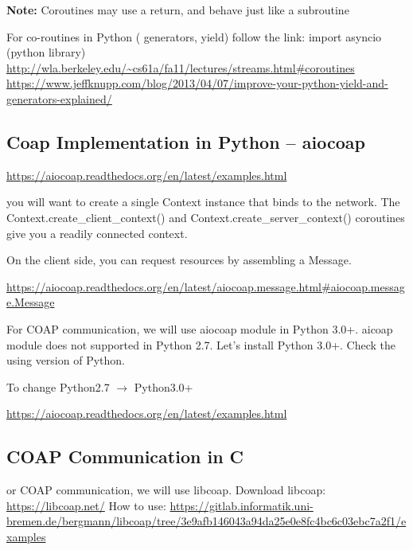 \documentclass[letterpaper,10pt,english]{sphinxmanual}
\begin{document}
\textbf{Note:} Coroutines may use a return, and behave just like a subroutine

For co-routines in Python ( generators, yield) follow the link: import asyncio (python library)
\href{http://wla.berkeley.edu/~cs61a/fa11/lectures/streams.html\#coroutines}{http://wla.berkeley.edu/\textasciitilde{}cs61a/fa11/lectures/streams.html\#coroutines}
\href{https://www.jeffknupp.com/blog/2013/04/07/improve-your-python-yield-and-generators-explained/}{https://www.jeffknupp.com/blog/2013/04/07/improve-your-python-yield-and-generators-explained/}


\subsection{Coap Implementation in Python – aiocoap}
\label{week-10:coap-implementation-in-python-aiocoap}
\href{https://aiocoap.readthedocs.org/en/latest/examples.html}{https://aiocoap.readthedocs.org/en/latest/examples.html}

you will want to create a single Context instance that binds to the network.  The Context.create\_client\_context() and Context.create\_server\_context() coroutines give you a readily connected context.

On the client side, you can request resources by assembling a Message.

\href{https://aiocoap.readthedocs.org/en/latest/aiocoap.message.html\#aiocoap.message.Message}{https://aiocoap.readthedocs.org/en/latest/aiocoap.message.html\#aiocoap.message.Message}

For COAP communication, we will use aiocoap module in Python 3.0+. aicoap module does not supported in Python 2.7. Let's install Python 3.0+.
Check the using version of Python.


To change Python2.7 \(\rightarrow\) Python3.0+


\href{https://aiocoap.readthedocs.org/en/latest/examples.html}{https://aiocoap.readthedocs.org/en/latest/examples.html}


\subsection{COAP Communication in C}
\label{week-10:coap-communication-in-c}
or COAP communication, we will use libcoap.
Download libcoap: \href{https://libcoap.net/}{https://libcoap.net/}
How to use: \href{https://gitlab.informatik.uni-bremen.de/bergmann/libcoap/tree/3e9afb146043a94da25e0e8fc4bc6c03ebc7a2f1/examples}{https://gitlab.informatik.uni-bremen.de/bergmann/libcoap/tree/3e9afb146043a94da25e0e8fc4bc6c03ebc7a2f1/examples}
\label{appendix:appendix}
\end{document}
